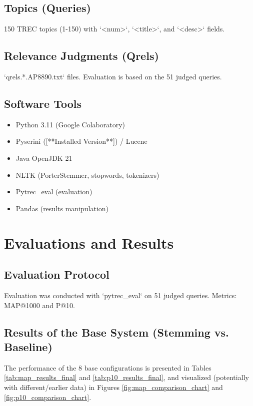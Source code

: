 \documentclass[11pt,a4paper]{article}
\begin{document}
\subsection{Topics (Queries)}
150 TREC topics (1-150) with `<num>`, `<title>`, and `<desc>` fields.

\subsection{Relevance Judgments (Qrels)}
`qrels.*.AP8890.txt` files. Evaluation is based on the 51 judged queries.

\subsection{Software Tools}
\begin{itemize}
    \item Python 3.11 (Google Colaboratory)
    \item Pyserini ([**Installed Version**]) / Lucene
    \item Java OpenJDK 21
    \item NLTK (PorterStemmer, stopwords, tokenizers)
    \item Pytrec\_eval (evaluation)
    \item Pandas (results manipulation)
\end{itemize}

\section{Evaluations and Results}
\label{sec:eval}
\subsection{Evaluation Protocol}
Evaluation was conducted with `pytrec_eval` on 51 judged queries. Metrics: MAP@1000 and P@10.

\subsection{Results of the Base System (Stemming vs. Baseline)}
The performance of the 8 base configurations is presented in Tables \ref{tab:map_results_final} and \ref{tab:p10_results_final}, and visualized (potentially with different/earlier data) in Figures \ref{fig:map_comparison_chart} and \ref{fig:p10_comparison_chart}.
\end{document}
